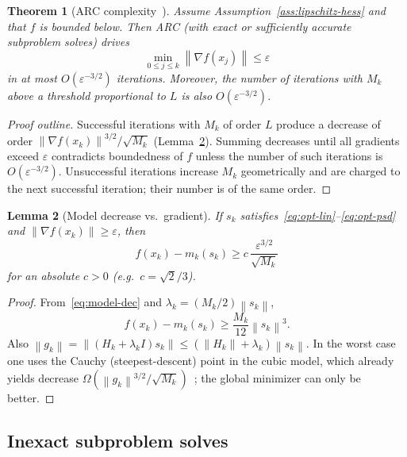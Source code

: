\documentclass[11pt,a4paper]{article}
\newtheorem{theorem}{Theorem}[section]
\newtheorem{lemma}[theorem]{Lemma}
\newcommand{\norm}[1]{\left\|#1\right\|}
\newcommand{\grad}{\nabla}
\begin{document}
\begin{theorem}[ARC complexity~\cite{cartis2011arc}]
\label{thm:arc}
Assume Assumption~\ref{ass:lipschitz-hess} and that $f$ is bounded below.
Then ARC (with exact or sufficiently accurate subproblem solves) drives
\begin{equation}
\min_{0\le j\le k}\norm{\grad f(x_{j})}
\le\varepsilon
\end{equation}
in at most $O(\varepsilon^{-3/2})$ iterations.
Moreover, the number of iterations with $M_{k}$ above a threshold proportional to $L$ is also $O(\varepsilon^{-3/2})$.
\end{theorem}

\begin{proof}[Proof outline]
Successful iterations with $M_{k}$ of order $L$ produce a decrease of order $\norm{\grad f(x_{k})}^{3/2}/\sqrt{M_{k}}$ (Lemma~\ref{lem:arc-decrease}).
Summing decreases until all gradients exceed $\varepsilon$ contradicts boundedness of $f$ unless the number of such iterations is $O(\varepsilon^{-3/2})$.
Unsuccessful iterations increase $M_{k}$ geometrically and are charged to the next successful iteration; their number is of the same order.
\end{proof}

\begin{lemma}[Model decrease vs.\ gradient]
\label{lem:arc-decrease}
If $s_{k}$ satisfies~\eqref{eq:opt-lin}--\eqref{eq:opt-psd} and $\norm{\grad f(x_{k})}\ge\varepsilon$, then
\begin{equation}
f(x_{k})-m_{k}(s_{k})
\ge
c\,\frac{\varepsilon^{3/2}}{\sqrt{M_{k}}}
\end{equation}
for an absolute $c>0$ (e.g.\ $c=\sqrt{2}/3$).
\end{lemma}

\begin{proof}
From~\eqref{eq:model-dec} and $\lambda_{k}=(M_{k}/2)\norm{s_{k}}$,
\[
f(x_{k})-m_{k}(s_{k})
\ge
\frac{M_{k}}{12}\norm{s_{k}}^{3}.
\]
Also $\norm{g_{k}}=\norm{(H_{k}+\lambda_{k}I)s_{k}}\le(\norm{H_{k}}+\lambda_{k})\norm{s_{k}}$.
In the worst case one uses the Cauchy (steepest-descent) point in the cubic model, which already yields decrease $\Omega(\norm{g_{k}}^{3/2}/\sqrt{M_{k}})$~\cite{cartis2011arc}; the global minimizer can only be better.
\end{proof}

\subsection{Inexact subproblem solves}
\end{document}
